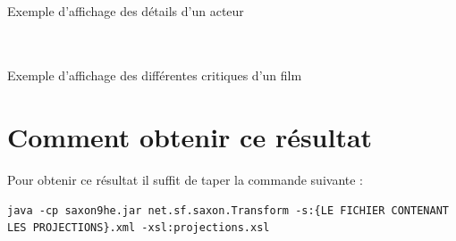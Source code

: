 \documentclass[french]{article}
\begin{document}
\begin{center}
      \\\caption{Exemple d'affichage des détails d'un acteur}
      \\\vspace{30}
      \\\caption{Exemple d'affichage des différentes critiques d'un film}
    \end{center}


    \newpage
    \section{Comment obtenir ce résultat}
    Pour obtenir ce résultat il suffit de taper la commande suivante :\\
    \begin{lstlisting}[numbers=none]
      java -cp saxon9he.jar net.sf.saxon.Transform -s:{LE FICHIER CONTENANT LES PROJECTIONS}.xml -xsl:projections.xsl
    \end{lstlisting}
\end{document}
